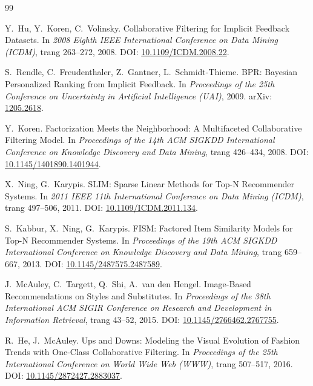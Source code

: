 \begin{thebibliography}{99}
\setlength{\itemsep}{2pt}

Y.~Hu, Y.~Koren, C.~Volinsky.
\newblock Collaborative Filtering for Implicit Feedback Datasets.
\newblock In \emph{2008 Eighth IEEE International Conference on Data Mining (ICDM)}, trang 263--272, 2008.
\newblock DOI: \href{https://doi.org/10.1109/ICDM.2008.22}{10.1109/ICDM.2008.22}.

S.~Rendle, C.~Freudenthaler, Z.~Gantner, L.~Schmidt-Thieme.
\newblock BPR: Bayesian Personalized Ranking from Implicit Feedback.
\newblock In \emph{Proceedings of the 25th Conference on Uncertainty in Artificial Intelligence (UAI)}, 2009.
\newblock arXiv: \href{https://arxiv.org/abs/1205.2618}{1205.2618}.

Y.~Koren.
\newblock Factorization Meets the Neighborhood: A Multifaceted Collaborative Filtering Model.
\newblock In \emph{Proceedings of the 14th ACM SIGKDD International Conference on Knowledge Discovery and Data Mining}, trang 426--434, 2008.
\newblock DOI: \href{https://doi.org/10.1145/1401890.1401944}{10.1145/1401890.1401944}.

X.~Ning, G.~Karypis.
\newblock SLIM: Sparse Linear Methods for Top-N Recommender Systems.
\newblock In \emph{2011 IEEE 11th International Conference on Data Mining (ICDM)}, trang 497--506, 2011.
\newblock DOI: \href{https://doi.org/10.1109/ICDM.2011.134}{10.1109/ICDM.2011.134}.

S.~Kabbur, X.~Ning, G.~Karypis.
\newblock FISM: Factored Item Similarity Models for Top-N Recommender Systems.
\newblock In \emph{Proceedings of the 19th ACM SIGKDD International Conference on Knowledge Discovery and Data Mining}, trang 659--667, 2013.
\newblock DOI: \href{https://doi.org/10.1145/2487575.2487589}{10.1145/2487575.2487589}.

J.~McAuley, C.~Targett, Q.~Shi, A.~van den Hengel.
\newblock Image-Based Recommendations on Styles and Substitutes.
\newblock In \emph{Proceedings of the 38th International ACM SIGIR Conference on Research and Development in Information Retrieval}, trang 43--52, 2015.
\newblock DOI: \href{https://doi.org/10.1145/2766462.2767755}{10.1145/2766462.2767755}.

R.~He, J.~McAuley.
\newblock Ups and Downs: Modeling the Visual Evolution of Fashion Trends with One-Class Collaborative Filtering.
\newblock In \emph{Proceedings of the 25th International Conference on World Wide Web (WWW)}, trang 507--517, 2016.
\newblock DOI: \href{https://doi.org/10.1145/2872427.2883037}{10.1145/2872427.2883037}.


\end{thebibliography}
